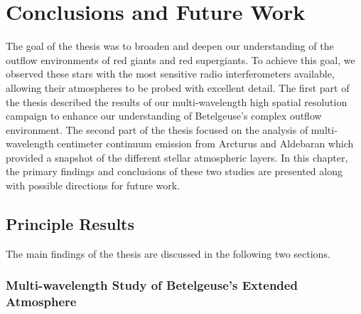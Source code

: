 \chapter{Conclusions and Future Work}
\label{chap:8}

The goal of the thesis was to broaden and deepen our understanding of the outflow environments of red giants and red supergiants. To achieve this goal, we observed these stars with the most sensitive radio interferometers available, allowing their atmospheres to be probed with excellent detail. The first part of the thesis described the results of our multi-wavelength high spatial resolution campaign to enhance our understanding of Betelgeuse's complex outflow environment. The second part of the thesis focused on the analysis of multi-wavelength centimeter continuum emission from Arcturus and Aldebaran which provided a snapshot of the different stellar atmospheric layers. In this chapter, the primary findings and conclusions of these two studies are presented along with possible directions for future work.

\pagebreak

\section{Principle Results}\label{sec:8.1}
The main findings of the thesis are discussed in the following two sections.
\subsection{Multi-wavelength Study of Betelgeuse's Extended Atmosphere}\label{sec:8.1.1}

